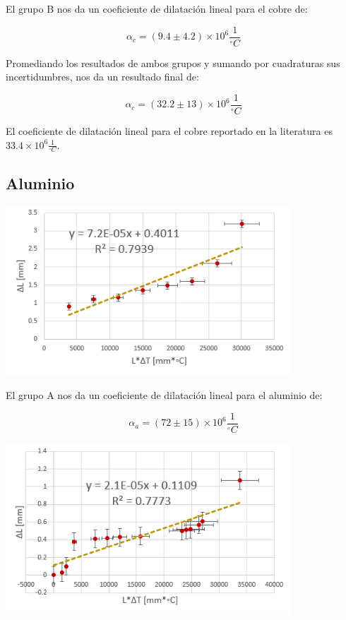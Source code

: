 \documentclass[DIV=calc, paper=a4, fontsize=11pt]{scrartcl}
\newenvironment{Figura}
  {\par\medskip\noindent\minipage{\linewidth}}
  {\endminipage\par\medskip}
\begin{document}
\begin{multicols}{2}
El grupo B nos da un coeficiente de dilatación lineal para el cobre de:

\begin{equation*}
    \alpha_{c} = (9.4 \pm 4.2)\times 10^{6} \frac{1}{^{\circ}C}
\end{equation*}


Promediando los resultados de ambos grupos y sumando por cuadraturas sus incertidumbres, nos da un resultado final de:

\begin{equation*}
    \alpha_{c} = (32.2 \pm 13)\times 10^{6} \frac{1}{^{\circ}C}
\end{equation*}

El coeficiente de dilatación lineal para el cobre reportado en la literatura es $33.4 \times 10^{6} \frac{1}{^{\circ}C}$.

\subsection*{Aluminio}

\begin{Figura}
\centering
    \includegraphics[width=0.8\textwidth]{grafica/aluminioA.PNG}
    \label{fig}
\end{Figura}

El grupo A nos da un coeficiente de dilatación lineal para el aluminio de:

\begin{equation*}
    \alpha_{a} = (72 \pm 15) \times 10^{6} \frac{1}{^{\circ}C}
\end{equation*}

\begin{Figura}
\centering
    \includegraphics[width=0.8\textwidth]{grafica/aluminioB.PNG}
    \label{fig}
\end{Figura}


\end{multicols}
\end{document}
